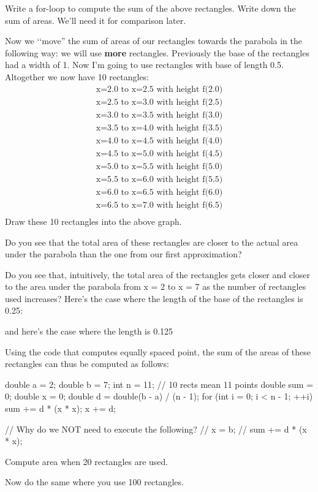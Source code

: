 \begin{ex}
Write a for-loop to compute the sum of the above
rectangles. Write down the sum of areas. We'll need it
for comparison later.
\end{ex}
Now we \lq\lq move'' the sum of areas of our rectangles towards the parabola
in the following way: we will use \textbf{more} rectangles. Previously the
base of the rectangles had a width of 1. Now I'm going
to use rectangles with base of length 0.5. Altogether we now have 10
rectangles:
\begin{align*}
\text{x=2.0 to x=2.5 with height f(2.0)}\\
\text{x=2.5 to x=3.0 with height f(2.5)}\\
\text{x=3.0 to x=3.5 with height f(3.0)}\\
\text{x=3.5 to x=4.0 with height f(3.5)}\\
\text{x=4.0 to x=4.5 with height f(4.0)}\\
\text{x=4.5 to x=5.0 with height f(4.5)}\\
\text{x=5.0 to x=5.5 with height f(5.0)}\\
\text{x=5.5 to x=6.0 with height f(5.5)}\\
\text{x=6.0 to x=6.5 with height f(6.0)}\\
\text{x=6.5 to x=7.0 with height f(6.5)}\\
\end{align*}
Draw these 10 rectangles into the above graph.


Do you see that the total area of these rectangles are closer to the
actual area under the parabola than the one from our first
approximation?

Do you see that, intuitively, the total area of the rectangles gets
closer and closer to the area under the parabola from x = 2 to x = 7 as
the number of rectangles used increases? Here's the case
where the length of the base of the rectangles is 0.25:

and here's the case where the length is 0.125


Using the code that computes equally spaced point, the sum of the areas
of these rectangles can thus be computed as follows:
\begin{console}
double a = 2;
double b = 7;
int n = 11; // 10 rects mean 11 points
double sum = 0;
double x = 0;
double d = double(b - a) / (n - 1);
for (int i = 0; i < n - 1; ++i)
{   
    sum += d * (x * x);
    x += d;
}

// Why do we NOT need to execute the following?
// x = b;
// sum += d * (x * x);
\end{console}
\begin{ex}
Compute area when 20 rectangles are used.
\end{ex}
\begin{ex}
Now do the same where you use 100 rectangles.
\end{ex}

